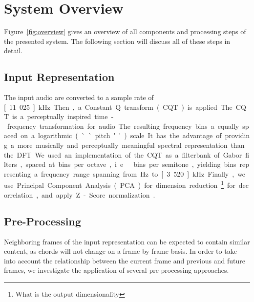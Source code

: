 \documentclass{article}
\begin{document}


\section{System Overview}
Figure~\ref{fig:overview} gives an overview of all components and processing steps of the presented system. The following section will discuss all of these steps in detail.
\subsection{Input Representation}
The input audio are converted to a sample rate of \unit[11.025]{kHz}. Then, a Constant Q transform (CQT) is applied. 
The CQT is a perceptually inspired time-frequency transformation for audio. The resulting frequency bins a equally spaced on a logarithmic (``pitch'') scale. It has the advantage of providing a more musically and perceptually meaningful spectral representation than the DFT. 
We used an implementation of the CQT as a filterbank of Gabor filters, spaced at \unit[36]{bins per octave}, i.e.\ \unit[3]{bins per semitone}, yielding \unit[180]{bins} representing a frequency range spanning from \unit[110]{Hz} to \unit[3.520]{kHz}. Finally, we use Principal Component Analysis (PCA) for dimension reduction\footnote{What is the output dimensionality} for decorrelation, and apply Z-Score normalization\cite{sola1997importance}. 

\subsection{Pre-Processing}\label{sec:pre-proc}
Neighboring frames of the input representation can be expected to contain similar content, as chords will not change on a frame-by-frame basis. In order to take into account the relationship between the current frame and previous and future frames, we investigate the application of several pre-processing approaches.
\end{document}
